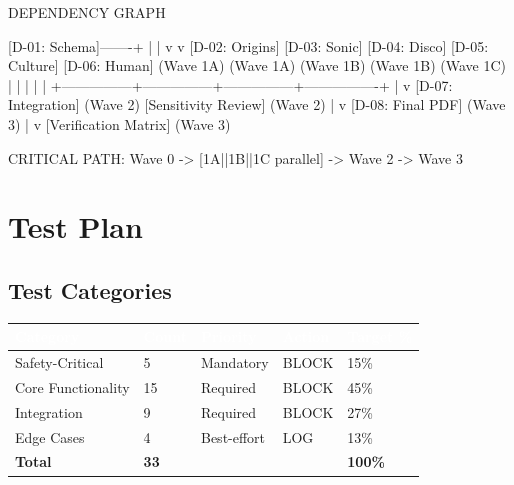 \documentclass[11pt,letterpaper]{article}
\newcommand{\tableheader}[1]{\textbf{\sffamily\textcolor{white}{#1}}}
\begin{document}
\begin{asciibox}
DEPENDENCY GRAPH

[D-01: Schema]-------+
       |             |
       v             v
[D-02: Origins]  [D-03: Sonic]    [D-04: Disco]  [D-05: Culture]  [D-06: Human]
   (Wave 1A)      (Wave 1A)       (Wave 1B)       (Wave 1B)         (Wave 1C)
       |               |               |               |                |
       +---------------+---------------+---------------+----------------+
                                        |
                                        v
                              [D-07: Integration]
                                  (Wave 2)
                              [Sensitivity Review]
                                  (Wave 2)
                                        |
                                        v
                               [D-08: Final PDF]
                                  (Wave 3)
                                        |
                                        v
                              [Verification Matrix]
                                  (Wave 3)

CRITICAL PATH: Wave 0 -> [1A||1B||1C parallel] -> Wave 2 -> Wave 3
\end{asciibox}

\section{Test Plan}

\subsection{Test Categories}

\begin{center}
\begin{tabularx}{\textwidth}{L{3.5cm}C{1.5cm}L{2.5cm}L{2cm}C{2cm}}
\toprule
{}
\tableheader{Category} & \tableheader{Count} & \tableheader{Priority} & \tableheader{Action} & \tableheader{Target \%} \\
\midrule
Safety-Critical & 5 & Mandatory & BLOCK & 15\% \\
Core Functionality & 15 & Required & BLOCK & 45\% \\
Integration & 9 & Required & BLOCK & 27\% \\
Edge Cases & 4 & Best-effort & LOG & 13\% \\
\midrule
\textbf{Total} & \textbf{33} & & & \textbf{100\%} \\
\bottomrule
\end{tabularx}
\end{center}
\end{document}
